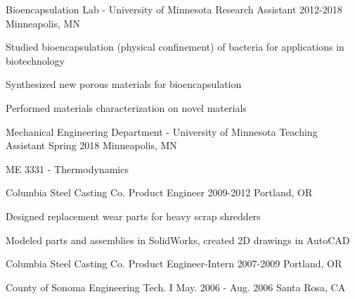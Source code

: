 \documentclass[11pt, letterpaper]{awesome-cv} %
\begin{document}
\begin{sloppypar}
\begin{cventries}
	\cventry
	{Bioencapsulation Lab - University of Minnesota} %
	{Research Assistant} %
	{2012-2018} %
	{Minneapolis, MN} %
	{ %
		\begin{cvitems}
			\item {Studied bioencapsulation (physical confinement) of bacteria for applications in biotechnology}
			\item {Synthesized new porous materials for bioencapsulation}
			\item {Performed materials characterization on novel materials}
		\end{cvitems}
	}

	\cventry
	{Mechanical Engineering Department - University of Minnesota} %
	{Teaching Assistant} %
	{Spring 2018} %
	{Minneapolis, MN} %
	{ %
		\begin{cvitems}
			\item {ME 3331 - Thermodynamics}
		\end{cvitems}
	}

	\cventry
	{Columbia Steel Casting Co.} %
	{Product Engineer} %
	{2009-2012} %
	{Portland, OR} %
	{ %
		\begin{cvitems}
			\item{Designed replacement wear parts for heavy scrap shredders} 
			\item{Modeled parts and assemblies in SolidWorks, created 2D drawings in AutoCAD} 
		\end{cvitems}
	}

	\cventry
	{Columbia Steel Casting Co.} %
	{Product Engineer-Intern} %
	{2007-2009} %
	{Portland, OR} %
	{ %
	}

	\cventry
	{County of Sonoma} %
	{Engineering Tech. I} %
	{May. 2006 - Aug. 2006} %
	{Santa Rosa, CA} %
	{
	}
	
\end{cventries}
%
{}%

\begin{cventries}
	

\end{cventries}
\end{sloppypar}
\end{document}
